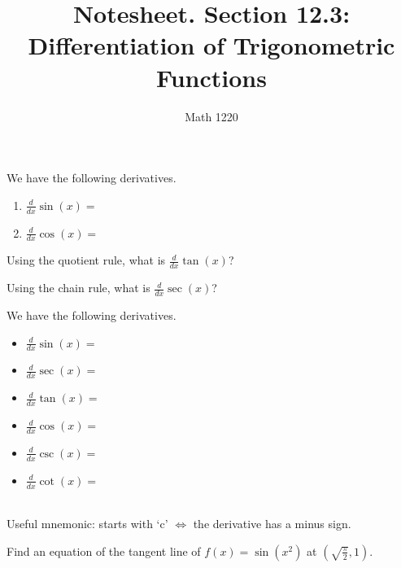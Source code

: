 \documentclass[12pt, a4paper]{article}
\author{Math 1220}
\title{Notesheet. Section 12.3: Differentiation of Trigonometric Functions}
\date{}
\begin{document}
\maketitle
\nameline
\begin{thrm}
  We have the following derivatives.
  \begin{enumerate}
  \item \(\frac{d}{dx} \sin(x) = \)
  \item \(\frac{d}{dx} \cos(x) = \)
  \end{enumerate}
\end{thrm}
\begin{ex}
  Using the quotient rule, what is \(\frac{d}{dx} \tan(x)\)?
\end{ex}
\begin{ex}
  Using the chain rule, what is \(\frac{d}{dx} \sec(x)\)? 
\end{ex}
\begin{thrm}
  We have the following derivatives.\\
  \begin{minipage}{0.5\linewidth}
    \begin{itemize}
    \item \(\frac{d}{dx} \sin(x) = \)
    \item \(\frac{d}{dx} \sec(x) = \)
    \item \(\frac{d}{dx} \tan(x) = \)
    \end{itemize}
  \end{minipage}
  \begin{minipage}{0.4\linewidth}
    \begin{itemize}
    \item \(\frac{d}{dx} \cos(x) = \)
    \item \(\frac{d}{dx} \csc(x) = \)
    \item \(\frac{d}{dx} \cot(x) = \)
    \end{itemize}
  \end{minipage}
  \ \\
  
  Useful mnemonic: starts with `c' \(\iff\) the derivative has a minus
  sign.
\end{thrm}
\begin{ex}
  Find an equation of the tangent line of \(f(x) = \sin(x^2)\) at
  \(\left( \sqrt{\frac{\pi}{2}}, 1 \right)\). 
\end{ex}
\end{document}
